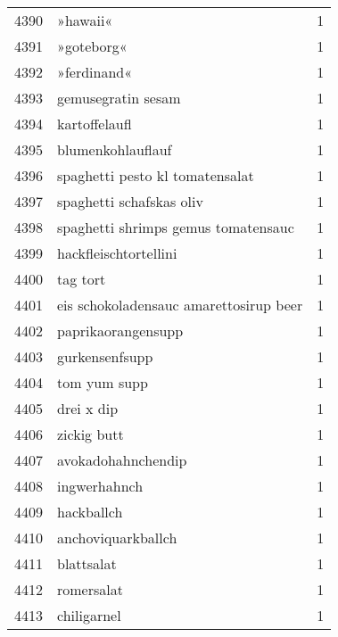 \begin{tabular}{llr}
4390 &                                           »hawaii« &      1 \\
4391 &                                         »goteborg« &      1 \\
4392 &                                        »ferdinand« &      1 \\
4393 &                                 gemusegratin sesam &      1 \\
4394 &                                      kartoffelaufl &      1 \\
4395 &                                  blumenkohlauflauf &      1 \\
4396 &                    spaghetti pesto kl tomatensalat &      1 \\
4397 &                           spaghetti schafskas oliv &      1 \\
4398 &                spaghetti shrimps gemus tomatensauc &      1 \\
4399 &                              hackfleischtortellini &      1 \\
4400 &                                           tag tort &      1 \\
4401 &             eis schokoladensauc amarettosirup beer &      1 \\
4402 &                                 paprikaorangensupp &      1 \\
4403 &                                     gurkensenfsupp &      1 \\
4404 &                                       tom yum supp &      1 \\
4405 &                                         drei x dip &      1 \\
4406 &                                        zickig butt &      1 \\
4407 &                                 avokadohahnchendip &      1 \\
4408 &                                       ingwerhahnch &      1 \\
4409 &                                         hackballch &      1 \\
4410 &                                 anchoviquarkballch &      1 \\
4411 &                                         blattsalat &      1 \\
4412 &                                         romersalat &      1 \\
4413 &                                        chiligarnel &      1 \\

\end{tabular}
